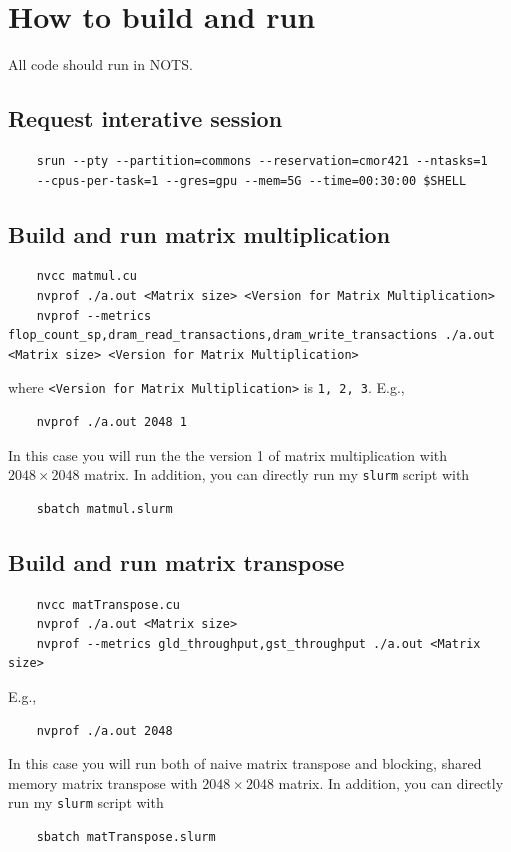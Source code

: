 \documentclass[11pt]{article}
\begin{document}
\newpage

\section{How to build and run}
All code should run in NOTS.
\subsection{Request interative session}
\begin{verbatim}
    srun --pty --partition=commons --reservation=cmor421 --ntasks=1
    --cpus-per-task=1 --gres=gpu --mem=5G --time=00:30:00 $SHELL
\end{verbatim}

\subsection{Build and run matrix multiplication}
\begin{verbatim}
    nvcc matmul.cu
    nvprof ./a.out <Matrix size> <Version for Matrix Multiplication>
    nvprof --metrics flop_count_sp,dram_read_transactions,dram_write_transactions ./a.out <Matrix size> <Version for Matrix Multiplication>

\end{verbatim}
where \verb|<Version for Matrix Multiplication>| is \verb|1, 2, 3|. E.g., 
\begin{verbatim}
    nvprof ./a.out 2048 1
\end{verbatim}
    
In this case you will run the the version 1 of matrix multiplication with $2048 \times 2048$ matrix. In addition, you can directly run my \verb|slurm| script with
\begin{verbatim}
    sbatch matmul.slurm
\end{verbatim}

\subsection{Build and run matrix transpose}
\begin{verbatim}
    nvcc matTranspose.cu
    nvprof ./a.out <Matrix size>
    nvprof --metrics gld_throughput,gst_throughput ./a.out <Matrix size>

\end{verbatim}
E.g., 
\begin{verbatim}
    nvprof ./a.out 2048
\end{verbatim}
In this case you will run both of naive matrix transpose and blocking, shared memory matrix transpose with $2048 \times 2048$ matrix. In addition, you can directly run my \verb|slurm| script with
\begin{verbatim}
    sbatch matTranspose.slurm
\end{verbatim}
\end{document}
